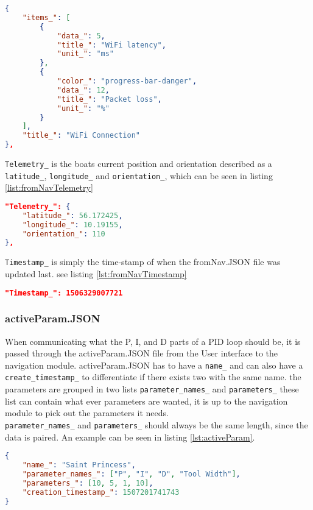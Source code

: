 \begin{lstlisting}[caption = {Example of an object in Status_ in fromNav.JSON}, captionpos=b, label={lst:fromNavStatusItem}, language=json,firstnumber=1]
{
    "items_": [
        {
            "data_": 5,
            "title_": "WiFi latency",
            "unit_": "ms"
        },
        {
            "color_": "progress-bar-danger",
            "data_": 12,
            "title_": "Packet loss",
            "unit_": "%"
        }
    ],
    "title_": "WiFi Connection"
},
\end{lstlisting}

\texttt{Telemetry_} is the boats current position and orientation described as a \texttt{latitude_}, \texttt{longitude_} and \texttt{orientation_}, which can be seen in listing \ref{list:fromNavTelemetry}

\begin{lstlisting}[caption = {Example of an Telemetry_ object in fromNav.JSON}, captionpos=b, label={lst:fromNavTelemetry}, language=json,firstnumber=1]
"Telemetry_": {
    "latitude_": 56.172425,
    "longitude_": 10.19155,
    "orientation_": 110
},
\end{lstlisting}

\texttt{Timestamp_} is simply the time-stamp of when the fromNav.JSON file was updated last. see listing \ref{lst:fromNavTimestamp} 

\begin{lstlisting}[caption = {Example of an Timestamp_ object in fromNav.JSON}, captionpos=b, label={lst:fromNavTimestamp}, language=json,firstnumber=1]
"Timestamp_": 1506329007721
\end{lstlisting}


\subsubsection{activeParam.JSON}
When communicating what the P, I, and D parts of a PID loop should be, it is passed through the activeParam.JSON file from the User interface to the navigation module. activeParam.JSON has to have a \texttt{name_} and can also have a \texttt{create_timestamp_} to differentiate if there exists two with the same name. the parameters are grouped in two lists \texttt{parameter_names_} and \texttt{parameters_} these list can contain what ever parameters are wanted, it is up to the navigation module to pick out the parameters it needs.\\
\texttt{parameter_names_} and \texttt{parameters_} should always be the same length, since the data is paired.
An example can be seen in listing \ref{lst:activeParam}.
\begin{lstlisting}[caption = {Example of activeParam.JSON}, captionpos=b, label={lst:activeParam}, language=json,firstnumber=1]
{
	"name_": "Saint Princess",
	"parameter_names_": ["P", "I", "D", "Tool Width"],
	"parameters_": [10, 5, 1, 10],
	"creation_timestamp_": 1507201741743
}
\end{lstlisting}


